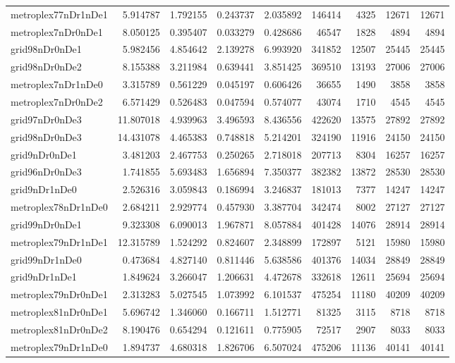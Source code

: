 \begin{longtable}{|l|r|r|r|r|r|r|r|r|}
metroplex77nDr1nDe1 & 5.914787 & 1.792155 & 0.243737 & 2.035892 & 146414 & 4325 & 12671 & 12671 \\
metroplex7nDr0nDe1 & 8.050125 & 0.395407 & 0.033279 & 0.428686 & 46547 & 1828 & 4894 & 4894 \\
grid98nDr0nDe1 & 5.982456 & 4.854642 & 2.139278 & 6.993920 & 341852 & 12507 & 25445 & 25445 \\
grid98nDr0nDe2 & 8.155388 & 3.211984 & 0.639441 & 3.851425 & 369510 & 13193 & 27006 & 27006 \\
metroplex7nDr1nDe0 & 3.315789 & 0.561229 & 0.045197 & 0.606426 & 36655 & 1490 & 3858 & 3858 \\
metroplex7nDr0nDe2 & 6.571429 & 0.526483 & 0.047594 & 0.574077 & 43074 & 1710 & 4545 & 4545 \\
grid97nDr0nDe3 & 11.807018 & 4.939963 & 3.496593 & 8.436556 & 422620 & 13575 & 27892 & 27892 \\
grid98nDr0nDe3 & 14.431078 & 4.465383 & 0.748818 & 5.214201 & 324190 & 11916 & 24150 & 24150 \\
grid9nDr0nDe1 & 3.481203 & 2.467753 & 0.250265 & 2.718018 & 207713 & 8304 & 16257 & 16257 \\
grid96nDr0nDe3 & 1.741855 & 5.693483 & 1.656894 & 7.350377 & 382382 & 13872 & 28530 & 28530 \\
grid9nDr1nDe0 & 2.526316 & 3.059843 & 0.186994 & 3.246837 & 181013 & 7377 & 14247 & 14247 \\
metroplex78nDr1nDe0 & 2.684211 & 2.929774 & 0.457930 & 3.387704 & 342474 & 8002 & 27127 & 27127 \\
grid99nDr0nDe1 & 9.323308 & 6.090013 & 1.967871 & 8.057884 & 401428 & 14076 & 28914 & 28914 \\
metroplex79nDr1nDe1 & 12.315789 & 1.524292 & 0.824607 & 2.348899 & 172897 & 5121 & 15980 & 15980 \\
grid99nDr1nDe0 & 0.473684 & 4.827140 & 0.811446 & 5.638586 & 401376 & 14034 & 28849 & 28849 \\
grid9nDr1nDe1 & 1.849624 & 3.266047 & 1.206631 & 4.472678 & 332618 & 12611 & 25694 & 25694 \\
metroplex79nDr0nDe1 & 2.313283 & 5.027545 & 1.073992 & 6.101537 & 475254 & 11180 & 40209 & 40209 \\
metroplex81nDr0nDe1 & 5.696742 & 1.346060 & 0.166711 & 1.512771 & 81325 & 3115 & 8718 & 8718 \\
metroplex81nDr0nDe2 & 8.190476 & 0.654294 & 0.121611 & 0.775905 & 72517 & 2907 & 8033 & 8033 \\
metroplex79nDr1nDe0 & 1.894737 & 4.680318 & 1.826706 & 6.507024 & 475206 & 11136 & 40141 & 40141 \\

\end{longtable}
